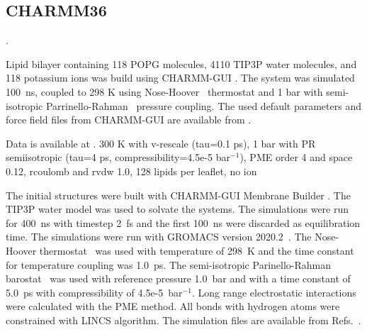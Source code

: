 \documentclass[journal=jpcbfk]{achemso}
\begin{document}
\subsection{CHARMM36}

 .

 

 Lipid bilayer containing 118 POPG molecules, 4110 TIP3P water molecules, and 118 potassium ions was build using CHARMM-GUI \cite{lee16}.
The system was simulated 100~ns, coupled to 298 K using Nose-Hoover~\cite{nose84,hoover85} thermostat and 1 bar with
semi-isotropic Parrinello-Rahman~\cite{parrinello81} pressure coupling.
The used default parameters and force field files from CHARMM-GUI are available from .


 

 Data is available at \cite{POPCcharmm300K,POPC1POPE1charmm36}.
300 K with v-rescale (tau=0.1 ps),
1 bar with PR semiisotropic (tau=4 ps, compressibility=4.5e-5 bar$^{-1}$),
PME order 4 and space 0.12,
rcoulomb and rvdw 1.0,
128 lipids per leaflet,
no ion 

The initial structures were built with CHARMM-GUI Membrane Builder \cite{lee16}. The TIP3P water model was used to solvate the systems. The simulations were run for 400~ns with timestep 2~fs and the first 100~ns were discarded as equilibration time. The simulations were run with GROMACS version 2020.2~\cite{pall20}. The Nose-Hoover thermostat~\cite{nose84,hoover85} was used with temperature of 298~K and the time constant for temperature coupling was 1.0~ps. The semi-isotropic Parinello-Rahman barostat~\cite{parrinello81} was used with reference pressure 1.0~bar and with a time constant of 5.0~ps with compressibility of 4.5e-5~bar$^{-1}$. Long range electrostatic interactions were calculated with the PME method. All bonds with hydrogen atoms were constrained with LINCS algorithm.
The simulation files are available from Refs.~.
\end{document}
